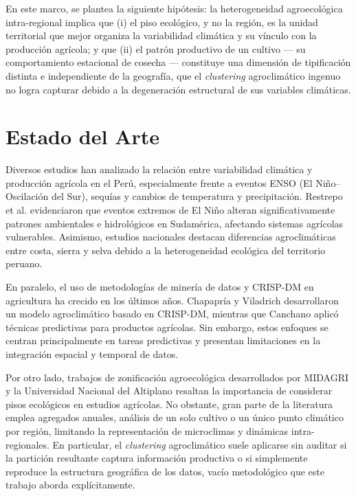\documentclass[conference]{IEEEtran}
\begin{document}
En este marco, se plantea la siguiente hipótesis: la heterogeneidad agroecológica intra-regional implica que (i) el piso ecológico, y no la región, es la unidad territorial que mejor organiza la variabilidad climática y su vínculo con la producción agrícola; y que (ii) el patrón productivo de un cultivo --- su comportamiento estacional de cosecha --- constituye una dimensión de tipificación distinta e independiente de la geografía, que el \textit{clustering} agroclimático ingenuo no logra capturar debido a la degeneración estructural de sus variables climáticas.

\section{Estado del Arte}
Diversos estudios han analizado la relación entre variabilidad climática y producción agrícola en el Perú, especialmente frente a eventos ENSO (El Niño--Oscilación del Sur), sequías y cambios de temperatura y precipitación. Restrepo et al. \cite{restrepo2017} evidenciaron que eventos extremos de El Niño alteran significativamente patrones ambientales e hidrológicos en Sudamérica, afectando sistemas agrícolas vulnerables. Asimismo, estudios nacionales destacan diferencias agroclimáticas entre costa, sierra y selva debido a la heterogeneidad ecológica del territorio peruano.

En paralelo, el uso de metodologías de minería de datos y CRISP-DM en agricultura ha crecido en los últimos años. Chapapría y Viladrich \cite{chapapria2024} desarrollaron un modelo agroclimático basado en CRISP-DM, mientras que Canchano \cite{canchano2024} aplicó técnicas predictivas para productos agrícolas. Sin embargo, estos enfoques se centran principalmente en tareas predictivas y presentan limitaciones en la integración espacial y temporal de datos.

Por otro lado, trabajos de zonificación agroecológica desarrollados por MIDAGRI \cite{midagri2025} y la Universidad Nacional del Altiplano \cite{una2023} resaltan la importancia de considerar pisos ecológicos en estudios agrícolas. No obstante, gran parte de la literatura emplea agregados anuales, análisis de un solo cultivo o un único punto climático por región, limitando la representación de microclimas y dinámicas intra-regionales. En particular, el \textit{clustering} agroclimático suele aplicarse sin auditar si la partición resultante captura información productiva o si simplemente reproduce la estructura geográfica de los datos, vacío metodológico que este trabajo aborda explícitamente.
\end{document}
